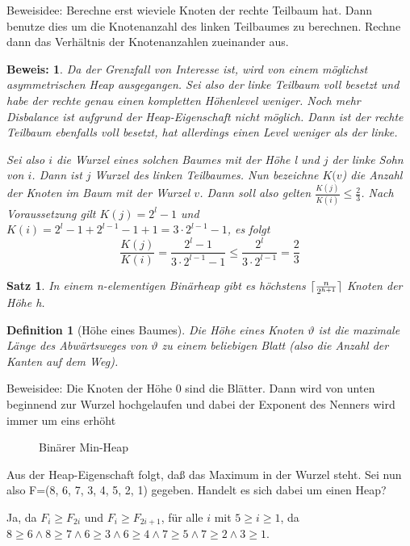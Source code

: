 \documentclass[ngerman,draft,parskip=half*,twoside]{scrreprt}
\theoremstyle{break}
\newtheorem{satz}{Satz}[chapter]
\newtheorem{definition}{Definition}[chapter]
\theoremstyle{nonumberbreak}
\newtheorem{beweis}{Beweis:}
\DeclarePairedDelimiter{\ceil}{\lceil}{\rceil}
\begin{document}
Beweisidee: Berechne erst wieviele Knoten der rechte Teilbaum hat. Dann benutze dies um die Knotenanzahl des linken Teilbaumes zu
berechnen. Rechne dann das Verhältnis der Knotenanzahlen zueinander aus.
\begin{beweis}
Da der Grenzfall von Interesse ist, wird von einem möglichst asymmetrischen Heap ausgegangen. Sei also der linke Teilbaum voll besetzt
und habe der rechte genau einen kompletten Höhenlevel weniger. Noch mehr Disbalance ist aufgrund der Heap-Eigenschaft nicht möglich.
Dann ist der rechte Teilbaum ebenfalls voll besetzt, hat allerdings einen Level weniger als der linke.

Sei also $i$ die Wurzel eines solchen Baumes mit der Höhe l und $j$ der linke Sohn von $i$. Dann ist $j$ Wurzel des linken Teilbaumes. 
Nun bezeichne $K(v$) die Anzahl der Knoten im Baum mit der Wurzel $v$. Dann soll also gelten 
$\frac{K(j)}{K(i)} \leq \frac{2}{3}$.
Nach Voraussetzung gilt $K(j)=2^l-1$ und $K(i)=2^l-1+2^{l-1}-1+1=3 \cdot 2^{l-1}-1$, es folgt
\[\frac{K(j)}{K(i)}= \frac{2^l-1}{3\cdot 2^{l-1}-1} \leq \frac{2^l}{3 \cdot 2^{l-1}}= \frac{2}{3}\]
\end{beweis}

\begin{satz}
In einem n-elementigen Binärheap gibt es höchstens $\ceil{ \frac{n}{2^{h+1}}}$ Knoten der Höhe h.
\end{satz}

\begin{definition}[Höhe eines Baumes]
Die Höhe eines Knoten $\vartheta$ ist die maximale Länge des Abwärtsweges von $\vartheta$ zu einem beliebigen Blatt (also die Anzahl
der Kanten auf dem Weg).
\end{definition}

Beweisidee:
Die Knoten der Höhe 0 sind die Blätter. Dann wird von unten beginnend zur Wurzel hochgelaufen und dabei der
Exponent des Nenners wird immer um eins erhöht
\begin{figure}[H]
	\centering
	\caption{Binärer Min-Heap}
	\label{101103b}
\end{figure}

Aus der Heap-Eigenschaft folgt, daß das Maximum in der Wurzel steht. Sei nun also F=(8, 6, 7, 3, 4, 5, 2, 1) gegeben. Handelt es sich
dabei um einen Heap?

Ja, da $F_{i}\geq F_{2i}$ und $F_{i}\geq F_{2i+1}$, für alle $i$ mit $5\geq i \geq 1$, da $8\geq 6 \wedge 8\geq 7 \wedge6\geq 3 \wedge 
6\geq 4 \wedge 7\geq 5 \wedge 7\geq 2 \wedge 3\geq 1$.
\end{document}
